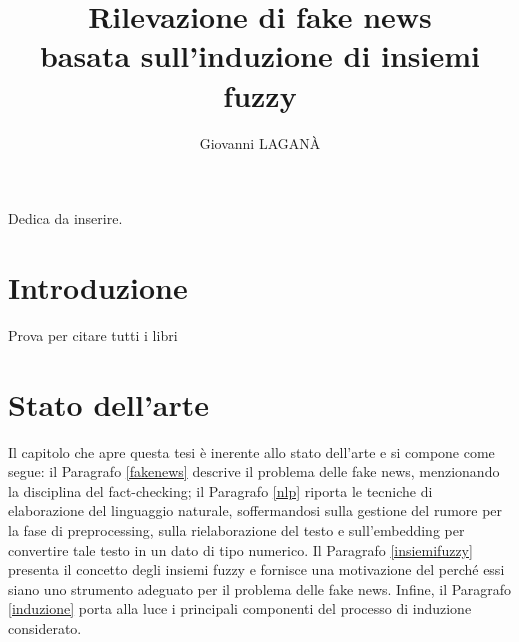 \documentclass[12pt]{report}
\theoremstyle{definition}
\begin{document}
\title{Rilevazione di fake news \\
basata sull'induzione di insiemi fuzzy}
\author{Giovanni LAGANÀ}
%
%
%
\beforepreface
        {\hfill \Large {\sl \begin{flushright} Dedica da inserire.         
\end{flushright}         }}
%
%
%
%
\afterpreface

%
%

\chapter*{Introduzione}
  
\onehalfspacing

Prova per citare tutti i libri
\cite{1,2,3,4,5,6,7,8,9,10,11,12,13,14,15,16,17,18,19,20,21,22}


\chapter{Stato dell'arte}
\label{Capitolo 1}
\onehalfspacing

Il capitolo che apre questa tesi è inerente allo stato dell'arte e si compone come segue: il Paragrafo \ref{fakenews} descrive il problema delle fake news, menzionando la disciplina del fact-checking; il Paragrafo \ref{nlp} riporta le tecniche di elaborazione del linguaggio naturale, soffermandosi sulla gestione del rumore per la fase di preprocessing, sulla rielaborazione del testo e sull'embedding per convertire tale testo in un dato di tipo numerico. 
Il Paragrafo \ref{insiemifuzzy} presenta il concetto degli insiemi fuzzy e fornisce una motivazione del perché essi siano uno strumento adeguato per il problema delle fake news.
Infine, il Paragrafo \ref{induzione} porta alla luce i principali componenti del processo di induzione considerato.
\end{document}
